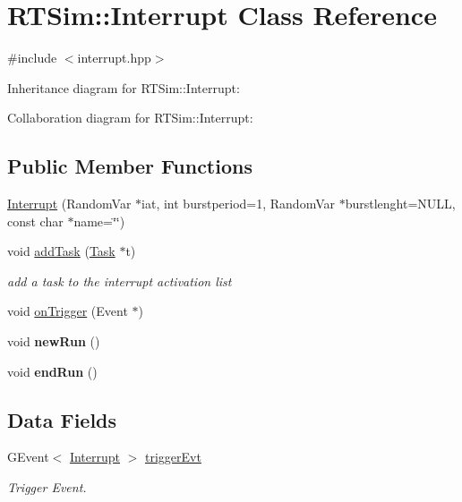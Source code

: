 \hypertarget{classRTSim_1_1Interrupt}{}\section{R\+T\+Sim\+:\+:Interrupt Class Reference}
\label{classRTSim_1_1Interrupt}


{\ttfamily \#include $<$interrupt.\+hpp$>$}



Inheritance diagram for R\+T\+Sim\+:\+:Interrupt\+:


Collaboration diagram for R\+T\+Sim\+:\+:Interrupt\+:
\subsection*{Public Member Functions}
\begin{DoxyCompactItemize}
\item 
\hyperlink{classRTSim_1_1Interrupt_a3116c7cfbed5f0cafad0c7a701ebb21a}{Interrupt} (Random\+Var $\ast$iat, int burstperiod=1, Random\+Var $\ast$burstlenght=N\+U\+LL, const char $\ast$name=\char`\"{}\char`\"{})
\item 
void \hyperlink{classRTSim_1_1Interrupt_a61163f37e72e5c2df8876584290d3658}{add\+Task} (\hyperlink{classRTSim_1_1Task}{Task} $\ast$t)\hypertarget{classRTSim_1_1Interrupt_a61163f37e72e5c2df8876584290d3658}{}\label{classRTSim_1_1Interrupt_a61163f37e72e5c2df8876584290d3658}

\begin{DoxyCompactList}\small\item\em add a task to the interrupt activation list \end{DoxyCompactList}\item 
void \hyperlink{classRTSim_1_1Interrupt_ac0f7933582d3960fd25f73a06584d95b}{on\+Trigger} (Event $\ast$)
\item 
void {\bfseries new\+Run} ()\hypertarget{classRTSim_1_1Interrupt_a44e42b1abd0e076b4e8c787d5e064f5a}{}\label{classRTSim_1_1Interrupt_a44e42b1abd0e076b4e8c787d5e064f5a}

\item 
void {\bfseries end\+Run} ()\hypertarget{classRTSim_1_1Interrupt_acf310d74616955414eb8a82ad6345f30}{}\label{classRTSim_1_1Interrupt_acf310d74616955414eb8a82ad6345f30}

\end{DoxyCompactItemize}
\subsection*{Data Fields}
\begin{DoxyCompactItemize}
\item 
G\+Event$<$ \hyperlink{classRTSim_1_1Interrupt}{Interrupt} $>$ \hyperlink{classRTSim_1_1Interrupt_af4c99431cc90dfbdca5be8cba05df6d6}{trigger\+Evt}\hypertarget{classRTSim_1_1Interrupt_af4c99431cc90dfbdca5be8cba05df6d6}{}\label{classRTSim_1_1Interrupt_af4c99431cc90dfbdca5be8cba05df6d6}

\begin{DoxyCompactList}\small\item\em Trigger Event. \end{DoxyCompactList}\end{DoxyCompactItemize}
